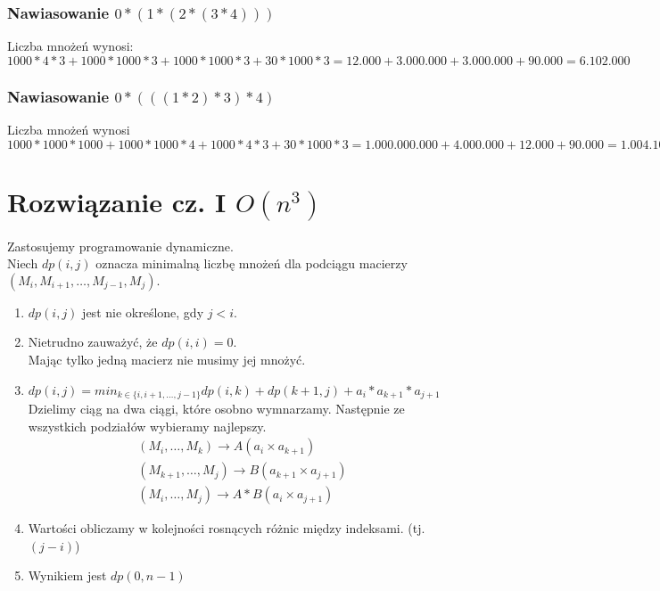 \documentclass{article}
\begin{document}
\subsubsection{Nawiasowanie $ 0 * (1 * (2 * (3 * 4))) $}
Liczba mnożeń wynosi: $ 1000 * 4 * 3 + 1000 * 1000 * 3 + 1000 * 1000 * 3 + 30 * 1000 * 3  =
12.000 + 3.000.000 + 3.000.000 + 90.000 = 6.102.000 $

\subsubsection{Nawiasowanie $  0 * (((1 * 2) * 3) * 4) $}
Liczba mnożeń wynosi $ 1000 * 1000 * 1000 + 1000 * 1000 * 4 + 1000 * 4 * 3 + 30 * 1000 * 3 =
1.000.000.000 + 4.000.000 + 12.000 + 90.000 = 1.004.102.000 $

\section{Rozwiązanie cz. I $ O(n^3) $ }
Zastosujemy programowanie dynamiczne. \\
Niech $ dp(i, j) $ oznacza minimalną liczbę mnożeń dla podciągu macierzy $ (M_{i}, M_{i+1}, \dots , M_{j-1}, M_{j}). $
\begin{enumerate}
\item $ dp(i, j) $ jest nie określone, gdy $ j < i $.
\item Nietrudno zauważyć, że $ dp(i, i) = 0 $. \\Mając tylko jedną macierz nie musimy jej mnożyć. 
\item $ dp(i, j) = min_{k \in \{ i, i + 1,  \dots, j-1 \} } dp(i, k) + dp(k + 1, j) + a_i * a_{k +1} * a_{j + 1} $ \\
Dzielimy ciąg na dwa ciągi, które osobno wymnarzamy. Następnie ze wszystkich podziałów wybieramy najlepszy. \\
\begin{gather*}
(M_{i}, \dots, M_{k}) \rightarrow A(a_i \times a_{k+1}) \\
(M_{k+1}, \dots, M_{j}) \rightarrow B(a_{k+1} \times a_{j+1}) \\
(M_{i}, \dots, M_{j}) \rightarrow A*B (a_i \times a_{j + 1})
\end{gather*}

\item Wartości obliczamy w kolejności rosnących różnic między indeksami. (tj. $ (j - i) $)
\item Wynikiem jest $ dp(0, n-1) $

\end{enumerate}
\end{document}
